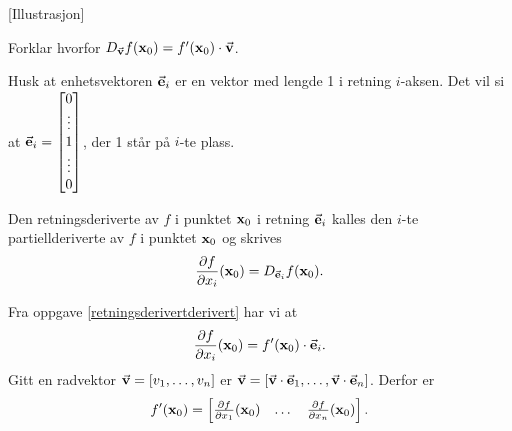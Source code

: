 [Illustrasjon]

\begin{oppgave}\label{retningsderivertderivert}
  Forklar hvorfor $D_{\vec{\mathbf{v}}} f(\mathbf{x}_0) = f'(\mathbf{x}_0)\cdot \vec{\mathbf{v}}$.
\end{oppgave}
  Husk at enhetsvektoren $\vec{\mathbf{e}}_i$ er en vektor med lengde 1 i retning $i$-aksen. Det vil
  si at $\vec{\mathbf{e}}_i = \begin{bmatrix} 0 \\ \vdots \\ 1 \\ \vdots \\ 0 \end{bmatrix}$, der 1
  står på $i$-te plass.
\begin{definisjon}
  Den retningsderiverte av $f$ i punktet $\mathbf{x}_0$ i retning $\vec{\mathbf{e}}_i$
  kalles den $i$-te partiellderiverte av $f$ i punktet $\mathbf{x}_0$ og skrives
  $$\frac{\partial f}{\partial x_i}(\mathbf{x}_0) = D_{\vec{\mathbf{e}}_i} f(\mathbf{x}_0).$$
\end{definisjon}
Fra oppgave \ref{retningsderivertderivert} har vi at
$$\frac{\partial f}{\partial x_i}(\mathbf{x}_0) = f'(\mathbf{x}_0)\cdot \vec{\mathbf{e}}_i.$$
Gitt en radvektor $\vec{\mathbf{v}} = [v_1, \dots, v_n]$ er $\vec{\mathbf{v}} = [\vec{\mathbf{v}} \cdot \vec{\mathbf{e}}_1, \dots, \vec{\mathbf{v}} \cdot \vec{\mathbf{e}}_n]$.
Derfor er
$$f'(\mathbf{x}_0) = \begin{bmatrix} \frac{\partial f}{\partial x_1}(\mathbf{x}_0) & \dots & \frac{\partial f}{\partial x_n}(\mathbf{x}_0) \end{bmatrix}.$$

